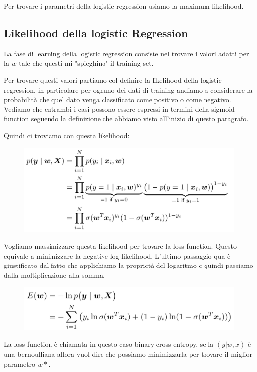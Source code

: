 \documentclass[14pt]{extreport}
\begin{document}
Per trovare i parametri della logistic regression usiamo la maximum likelihood.


\subsection{Likelihood della logistic Regression}

La fase di learning della logistic regression consiste nel trovare i valori adatti per la $w$ tale che questi mi "spieghino" il training set.

Per trovare questi valori partiamo col definire la likelihood della logistic regression, in particolare per ognuno dei dati di training andiamo a
considerare la probabilità che quel dato venga classificato come positivo o come negativo. Vediamo che entrambi i casi possono essere espressi in
termini della sigmoid function seguendo la definizione che abbiamo visto all'inizio di questo paragrafo.

Quindi ci troviamo con questa likelihood:

\begin{figure}[H]
\centering
\includegraphics[width=0.7\linewidth]{191.jpeg}
\end{figure}

Vogliamo massimizzare questa likelihood per trovare la loss function. Questo equivale a minimizzare la negative log likelihood. L'ultimo passaggio qua
è giustificato dal fatto che applichiamo la proprietà del logaritmo e quindi passiamo dalla moltiplicazione alla somma.

\begin{figure}[H]
\centering
\includegraphics[width=0.7\linewidth]{192.jpeg}
\end{figure}

La loss function è chiamata in questo caso binary cross entropy, se la $(y|w,x)$ è una bernoulliana allora vuol dire che possiamo minimizzarla per
trovare il miglior parametro $w*$.
\end{document}
